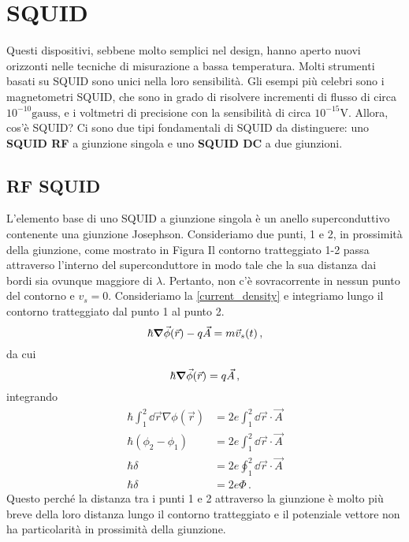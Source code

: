 \section{SQUID}
Questi dispositivi, sebbene molto semplici nel design, hanno aperto nuovi orizzonti nelle tecniche di misurazione a bassa temperatura. Molti strumenti basati su SQUID sono unici nella loro sensibilità. Gli esempi più celebri sono i magnetometri SQUID, che sono in grado di risolvere incrementi di flusso di circa $10^{-10} \text{gauss}$, e i voltmetri di precisione con la sensibilità di circa $10^{-15} \text{V}$. Allora, cos'è SQUID? Ci sono due tipi fondamentali di SQUID da distinguere: uno \textbf{SQUID RF} a giunzione singola e uno \textbf{SQUID DC} a due giunzioni.
\subsection{RF SQUID}
L'elemento base di uno SQUID a giunzione singola è un anello superconduttivo contenente una giunzione Josephson. Consideriamo due punti, 1 e 2, in prossimità della giunzione, come mostrato in Figura Il contorno tratteggiato 1-2 passa attraverso l'interno del superconduttore in modo tale che la sua distanza dai bordi sia ovunque maggiore di $\lambda$. Pertanto, non c'è sovracorrente in nessun punto del contorno e $v_s = 0$.
Consideriamo la \eqref{current_density} e integriamo lungo il contorno tratteggiato dal punto 1 al punto 2.
\begin{equation*}
    \hbar \grad \vec{\phi}(\vec r)-q\vec{A}=m\vec v_s(t) \, ,
\end{equation*}
da cui
\begin{equation*}
    \hbar \grad \vec{\phi}(\vec r)=q\vec{A} \, ,
\end{equation*}
integrando
\begin{equation*}
    \begin{aligned}
            \hbar \int_1^2 \dd{\vec r}\nabla \phi(\vec r) &= 2e\int_1^2 \dd{\vec r} \cdot \vec A \\
            \hbar \left(\phi_2-\phi_1\right) &= 2e\int_1^2 \dd{\vec r} \cdot \vec A \\
            \hbar \delta &= 2e \oint_1^2 \dd{\vec r} \cdot \vec A \\
            \hbar \delta &= 2e\Phi \, .
    \end{aligned}
\end{equation*}
Questo perché la distanza tra i punti 1 e 2 attraverso la giunzione è molto più breve della loro distanza lungo il contorno tratteggiato e il potenziale vettore non ha particolarità in prossimità della giunzione.
